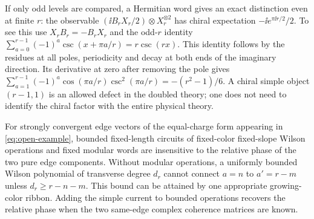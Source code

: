 If only odd levels are compared, a Hermitian word gives an exact distinction even at finite \(r\): the observable \((\ii B_r X_r/2)\otimes X_r^{\otimes2}\) has chiral expectation \(-\ii e^{\pi\ii r/2}/2\). To see this use \(X_r B_r=-B_r X_r\) and the odd-\(r\) identity
\(\sum_{a=0}^{r-1}(-1)^a\csc(x+\pi a/r)=r\csc(rx)\). This identity follows by the residues at all poles, periodicity and decay at both ends of the imaginary direction. Its derivative at zero after removing the pole gives
\(\sum_{a=1}^{r-1}(-1)^a\cos(\pi a/r)\csc^2(\pi a/r)=-(r^2-1)/6\).
A chiral simple object \((r-1,1)\) is an allowed defect in the doubled theory; one does not need to identify the chiral factor with the entire physical theory.

\begin{proposition}\label{prop:obstruction}
For strongly convergent edge vectors of the equal-charge form appearing in \eqref{eq:open-example}, bounded fixed-length circuits of fixed-color fixed-slope Wilson operations and fixed modular words are insensitive to the relative phase of the two pure edge components. Without modular operations, a uniformly bounded Wilson polynomial of transverse degree \(d_r\) cannot connect \(a=n\) to \(a'=r-m\) unless \(d_r\ge r-n-m\). This bound can be attained by one appropriate growing-color ribbon. Adding the simple current to bounded operations recovers the relative phase when the two same-edge complex coherence matrices are known.
\end{proposition}

